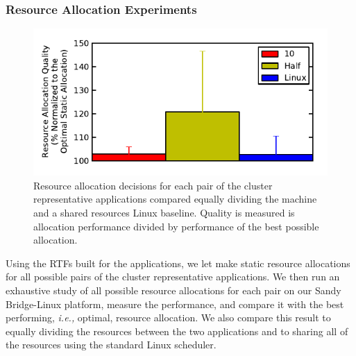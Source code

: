 \subsubsection{Resource Allocation Experiments}
\begin{figure}[!t]
	\begin{center}	
		\includegraphics[bb=0 0 288 144,width=\columnwidth]{Figures/decision_quality.pdf}
		\caption{Resource allocation decisions for each pair of the cluster representative applications compared equally dividing the machine and a shared resources Linux baseline. Quality is measured is allocation performance divided by performance of the best possible allocation.}
		\label{decision_quality}
	\end{center}
\end{figure}


Using the RTFs built for the applications, we let \pacora make static resource allocations for all possible pairs of the cluster representative applications.  We then run an exhaustive study of all possible resource allocations for each pair on our Sandy Bridge-Linux platform, measure the performance, and compare it with the best performing, \emph{i.e.,} optimal, resource allocation.  We also compare this result to equally dividing the resources between the two applications and to sharing all of the resources using the standard Linux scheduler.

